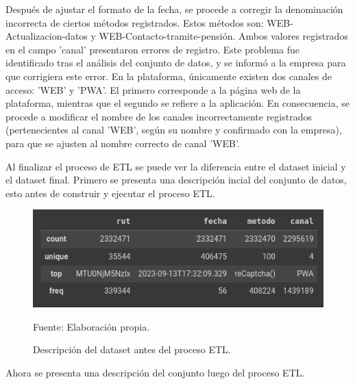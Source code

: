 Después de ajustar el formato de la fecha, se procede a corregir la denominación incorrecta de ciertos métodos registrados. Estos métodos son: WEB-Actualizacion-datos y WEB-Contacto-tramite-pensión. Ambos valores registrados en el campo 'canal' presentaron errores de registro. Este problema fue identificado tras el análisis del conjunto de datos, y se informó a la empresa para que corrigiera este error. En la plataforma, únicamente existen dos canales de acceso: 'WEB' y 'PWA'. El primero corresponde a la página web de la plataforma, mientras que el segundo se refiere a la aplicación. En consecuencia, se procede a modificar el nombre de los canales incorrectamente registrados (pertenecientes al canal 'WEB', según su nombre y confirmado con la empresa), para que se ajusten al nombre correcto de canal 'WEB'.

Al finalizar el proceso de ETL se puede ver la diferencia entre el dataset inicial y el dataset final. Primero se presenta una descripción incial del conjunto de datos, esto antes de construir y ejecutar el proceso ETL.

\begin{figure}[H]
    \begin{minipage}[t]{0.8\textwidth}
        \caption{Descripción del dataset antes del proceso ETL.}
        \label{describeInicial}        
    \end{minipage}

    \vspace{10pt}

    \centering
    \begin{minipage}[b]{0.8\textwidth}
        \centering
        \includegraphics[width=\textwidth]{img/describe_data_inicial.png}        
    \end{minipage}

    \begin{minipage}[t]{0.9\textwidth}
        Fuente: Elaboración propia.
    \end{minipage}
\end{figure}

Ahora se presenta una descripción del conjunto luego del proceso ETL.

